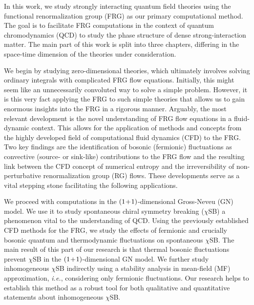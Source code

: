 \renewcommand{\ie}{\texorpdfstring{\textit{i.e.}}{i.e.}}
\renewcommand{\viz}{\texorpdfstring{\textit{viz.}}{viz.}}
\renewcommand{\twoDimensional}{\texorpdfstring{${(1 \mkern-3mu + \mkern-3mu 1)}$-dimensional}{(1+1)-dimensional}}
\renewcommand{\fourDimensional}{\texorpdfstring{${(3 \mkern-3mu + \mkern-3mu 1)}$-dimensional}{(3+1)-dimensional}}
\renewcommand{\csb}{\texorpdfstring{$\chi$SB}{χSB}}
%
In this work, we study strongly interacting quantum field theories using the functional renormalization group (FRG) as our primary computational method.
The goal is to facilitate FRG computations in the context of quantum chromodynamics (QCD) to study the phase structure of dense strong-interaction matter.
The main part of this work is split into three chapters, differing in the space-time dimension of the theories under consideration.

We begin by studying zero-dimensional theories, which ultimately involves solving ordinary integrals with complicated FRG flow equations. 
Initially, this might seem like an unnecessarily convoluted way to solve a simple problem.
However, it is this very fact \dash{} applying the FRG to such simple theories \dash{} that allows us to gain enormous insights into the FRG in a rigorous manner.
Arguably, the most relevant development is the novel understanding of FRG flow equations in a fluid-dynamic context.
This allows for the application of methods and concepts from the highly developed field of computational fluid dynamics (CFD) to the FRG.
Two key findings are the identification of bosonic (fermionic) fluctuations as convective (source- or sink-like) contributions to the FRG flow and the resulting link between the CFD concept of numerical entropy and the irreversibility of non-perturbative renormalization group (RG) flows.
These developments serve as a vital stepping stone facilitating the following applications.

We proceed with computations in the \twoDimensional{} Gross-Neveu (GN) model.
We use it to study spontaneous chiral symmetry breaking (\csb{}) \dash{} a phenomenon vital to the understanding of QCD.
Using the previously established CFD methods for the FRG, we study the effects of fermionic and crucially bosonic quantum and thermodynamic fluctuations on spontaneous \csb{}.
The main result of this part of our research is that thermal bosonic fluctuations prevent \csb{} in the \twoDimensional{} GN model.
We further study inhomogeneous \csb{} indirectly using a stability analysis in mean-field (MF) approximation, \ie{}, considering only fermionic fluctuations.
Our research helps to establish this method as a robust tool for both qualitative and quantitative statements about inhomogeneous \csb{}.

